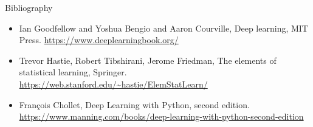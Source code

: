 \documentclass[xcolor=pdftex,dvipsnames,table,mathserif]{beamer}
\begin{document}
\begin{frame}{Bibliography}

  \begin{itemize}
  \item Ian Goodfellow and Yoshua Bengio and Aaron Courville, Deep learning, MIT Press. \url{https://www.deeplearningbook.org/}

  \item Trevor Hastie, Robert Tibshirani, Jerome Friedman, The elements of statistical learning, Springer. \url{https://web.stanford.edu/~hastie/ElemStatLearn/}

  \item François Chollet, Deep Learning with Python, second edition. \url{https://www.manning.com/books/deep-learning-with-python-second-edition}

  \end{itemize}
\end{frame}












\end{document}
